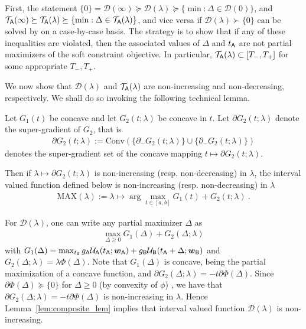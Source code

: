 	First, the statement $\{0\} = \mathcal{D}(\infty) \succeq \mathcal{D}(\lambda) \succeq \{\min:\Delta \in \mathcal{D}(0)\}$, and $\mathcal{T}_{\mathsf{A}}(\infty) \succeq \mathcal{T}_{\mathsf{A}}(\lambda) \succeq \{\min:\Delta \in \mathcal{T}_{\mathsf{A}}(\lambda)\}$, and vice versa if $\mathcal{D}(\lambda) \succ \{0\}$ can be solved by on a case-by-case basis. The strategy is to show that if any of these inequalities are violated, then the associated values of $\Delta$ and $t_{\mathsf{A}}$ are not partial maximizers of the soft constraint objective. In particular, $\mathcal{T}_{\mathsf{A}}(\lambda) \subset [T_-,T_+]$ for some appropriate $T_-,T_+$. 

	We now show that $\mathcal{D}(\lambda)$ and $\mathcal{T}_{\mathsf{A}}(\lambda)$ are non-increasing and non-decreasing, respectively. We shall do so invoking the following technical lemma.
	\begin{lem}\label{lem:composite_lem} Let $G_1(t)$ be concave and let $G_2(t;\lambda)$ be concave in $t$. Let $\partial G_2(t;\lambda)$ denote the super-gradient of $G_2$, that is 
	\begin{eqnarray*}
	\partial G_2(t;\lambda) := \mathrm{Conv}(\{\partial_- G_2(t;\lambda)\} \cup \{\partial_- G_2(t;\lambda)\})
	\end{eqnarray*}
	denotes the super-gradient set of the concave mapping $t \mapsto \partial G_2(t;\lambda)$.  

	Then if $\lambda \mapsto \partial G_2(t;\lambda)$ is non-increasing (resp. non-decreasing) in $\lambda$, the interval valued function defined below is non-increasing (resp. non-decreasing) in $\lambda$
	\begin{eqnarray*}
	\mathrm{MAX}(\lambda) := \lambda \mapsto  \arg\max_{t \in [a,b]} G_1(t) + G_2(t;\lambda)\:.
	\end{eqnarray*}
	
	\end{lem}
	For $\mathcal{D}(\lambda)$, one can write any partial maximizer $\Delta$ as 
	\begin{eqnarray*}
	\max_{\Delta \ge 0} G_1(\Delta) + G_2(\Delta;\lambda)
	\end{eqnarray*}
	with $G_1(\Delta) = \max_{t_{\mathsf{A}}} g_{\mathsf{A}} \mathcal{U}_{\mathsf{A}}(t_{\mathsf{A}};\boldsymbol{w}_{\mathsf{A}}) + g_{\mathsf{B}} \mathcal{U}_{\mathsf{B}}(t_{\mathsf{A}} + \Delta;\boldsymbol{w}_{\mathsf{B}})$ and $G_2(\Delta;\lambda) = \lambda\Phi(\Delta)$. Note that $G_1(\Delta)$ is concave, being the partial maximization of a concave function, and $\partial G_2(\Delta;\lambda) = -t\partial \Phi(\Delta)$. Since $\partial \Phi(\Delta) \succeq \{0\}$ for $\Delta \ge 0$ (by convexity of $\phi$) , we have that $\partial G_2(\Delta;\lambda) = -t\partial \Phi(\Delta)$ is non-increasing in $\lambda$. Hence Lemma~\ref{lem:composite_lem} implies that interval valued function $\mathcal{D}(\lambda)$ is non-increasing.
	
